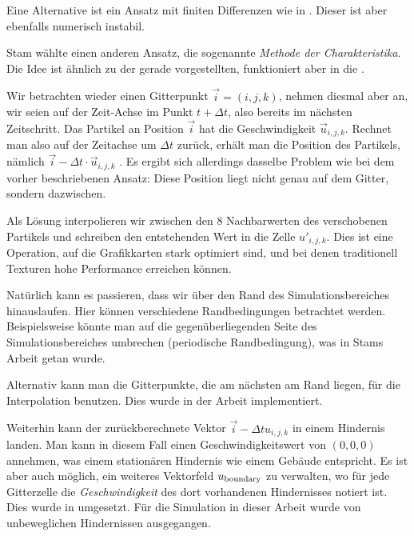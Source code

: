 Eine Alternative ist ein Ansatz mit finiten Differenzen wie in
\cite{Foster1997}. Dieser ist aber ebenfalls numerisch instabil.

Stam wählte einen anderen Ansatz, die sogenannte \emph{Methode der
Charakteristika}. Die Idee ist ähnlich zu der gerade vorgestellten, funktioniert
aber in die .

Wir betrachten wieder einen Gitterpunkt $\vec{i}=(i,j,k)$, nehmen diesmal aber
an, wir seien auf der Zeit-Achse im Punkt $t+\Delta t$, also bereits im nächsten
Zeitschritt. Das Partikel an Position $\vec{i}$ hat die Geschwindigkeit
$\vec{u}_{i,j,k}$. Rechnet man also auf der Zeitachse um $\Delta t$ zurück,
erhält man die  Position des Partikels, nämlich
$\vec{i} - \Delta t \cdot \vec{u}_{i,j,k}$ . Es ergibt sich allerdings dasselbe
Problem wie bei dem vorher beschriebenen Ansatz: Diese Position liegt nicht
genau auf dem Gitter, sondern dazwischen.

Als Lösung interpolieren wir zwischen den 8 Nachbarwerten des verschobenen
Partikels und schreiben den entstehenden Wert in die Zelle $u'_{i,j,k}$. Dies
ist eine Operation, auf die Grafikkarten stark optimiert sind, und bei denen
traditionell Texturen hohe Performance erreichen können.

Natürlich kann es passieren, dass wir über den Rand des Simulationsbereiches
hinauslaufen. Hier können verschiedene Randbedingungen betrachtet werden.
Beispielsweise könnte man auf die gegenüberliegenden Seite des
Simulationsbereiches umbrechen (periodische Randbedingung), was in Stams Arbeit
getan wurde.

Alternativ kann man die Gitterpunkte, die am nächsten am Rand liegen, für die
Interpolation benutzen. Dies wurde in der Arbeit implementiert.

Weiterhin kann der zurückberechnete Vektor $\vec{i} - \Delta t u_{i,j,k}$ in
einem Hindernis landen. Man kann in diesem Fall einen Geschwindigkeitswert
von $(0,0,0)$ annehmen, was einem stationären Hindernis wie einem Gebäude
entspricht. Es ist aber auch möglich, ein weiteres Vektorfeld
$u_{\textrm{boundary}}$ zu verwalten, wo für jede Gitterzelle die
\emph{Geschwindigkeit} des dort vorhandenen Hindernisses notiert ist. Dies wurde
in \cite{Crane2007} umgesetzt. Für die Simulation in dieser Arbeit wurde von
unbeweglichen Hindernissen ausgegangen.

